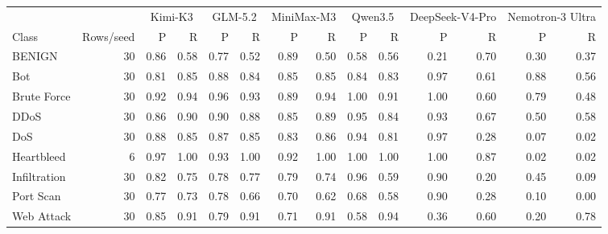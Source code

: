 \begin{tabular}{@{}lrrrrrrrrrrrrr@{}}
\toprule
 & & \multicolumn{2}{c}{Kimi-K3} & \multicolumn{2}{c}{GLM-5.2} & \multicolumn{2}{c}{MiniMax-M3} & \multicolumn{2}{c}{Qwen3.5} & \multicolumn{2}{c}{DeepSeek-V4-Pro} & \multicolumn{2}{c}{Nemotron-3 Ultra} \\
\cmidrule(lr){3-4}\cmidrule(lr){5-6}\cmidrule(lr){7-8}\cmidrule(lr){9-10}\cmidrule(lr){11-12}\cmidrule(lr){13-14}
Class & Rows/seed & P & R & P & R & P & R & P & R & P & R & P & R \\
\midrule
BENIGN & 30 & 0.86 & 0.58 & 0.77 & 0.52 & 0.89 & 0.50 & 0.58 & 0.56 & 0.21 & 0.70 & 0.30 & 0.37 \\
Bot & 30 & 0.81 & 0.85 & 0.88 & 0.84 & 0.85 & 0.85 & 0.84 & 0.83 & 0.97 & 0.61 & 0.88 & 0.56 \\
Brute Force & 30 & 0.92 & 0.94 & 0.96 & 0.93 & 0.89 & 0.94 & 1.00 & 0.91 & 1.00 & 0.60 & 0.79 & 0.48 \\
DDoS & 30 & 0.86 & 0.90 & 0.90 & 0.88 & 0.85 & 0.89 & 0.95 & 0.84 & 0.93 & 0.67 & 0.50 & 0.58 \\
DoS & 30 & 0.88 & 0.85 & 0.87 & 0.85 & 0.83 & 0.86 & 0.94 & 0.81 & 0.97 & 0.28 & 0.07 & 0.02 \\
Heartbleed & 6 & 0.97 & 1.00 & 0.93 & 1.00 & 0.92 & 1.00 & 1.00 & 1.00 & 1.00 & 0.87 & 0.02 & 0.02 \\
Infiltration & 30 & 0.82 & 0.75 & 0.78 & 0.77 & 0.79 & 0.74 & 0.96 & 0.59 & 0.90 & 0.20 & 0.45 & 0.09 \\
Port Scan & 30 & 0.77 & 0.73 & 0.78 & 0.66 & 0.70 & 0.62 & 0.68 & 0.58 & 0.90 & 0.28 & 0.10 & 0.00 \\
Web Attack & 30 & 0.85 & 0.91 & 0.79 & 0.91 & 0.71 & 0.91 & 0.58 & 0.94 & 0.36 & 0.60 & 0.20 & 0.78 \\
\bottomrule
\end{tabular}
